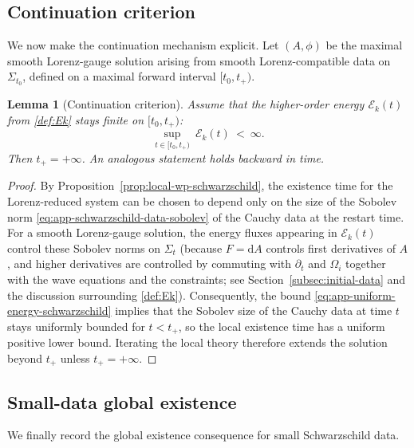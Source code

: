\documentclass[11pt]{article}
\numberwithin{equation}{section}
\theoremstyle{plain}
\newtheorem{lemma}[theorem]{Lemma}
\theoremstyle{definition}
\theoremstyle{remark}
\newcommand{\dd}{\mathrm{d}}
\begin{document}
\subsection{Continuation criterion}\label{app:schw-continuation}

We now make the continuation mechanism explicit.
Let $(A,\phi)$ be the maximal smooth Lorenz-gauge solution arising from smooth Lorenz-compatible data on $\Sigma_{t_0}$, defined on a maximal forward interval $[t_0,t_+)$.

\begin{lemma}[Continuation criterion]\label{lem:continuation-schwarzschild}
Assume that the higher-order energy $\mathcal E_k(t)$ from \eqref{def:Ek} stays finite on $[t_0,t_+)$:
\begin{equation}\label{eq:app-uniform-energy-schwarzschild}
\sup_{t\in[t_{0},t_{+})}\ \mathcal E_k(t)\ <\ \infty.
\end{equation}
Then $t_+=+\infty$.
An analogous statement holds backward in time.
\end{lemma}

\begin{proof}
By Proposition~\ref{prop:local-wp-schwarzschild}, the existence time for the Lorenz-reduced system can be chosen to depend only on the size of the Sobolev norm
\eqref{eq:app-schwarzschild-data-sobolev} of the Cauchy data at the restart time.
For a smooth Lorenz-gauge solution, the energy fluxes appearing in $\mathcal E_k(t)$ control these Sobolev norms on $\Sigma_t$
(because $F=\dd A$ controls first derivatives of $A$, and higher derivatives are controlled by commuting with $\partial_t$ and $\Omega_i$
together with the wave equations and the constraints; see Section~\ref{subsec:initial-data} and the discussion surrounding \eqref{def:Ek}).
Consequently, the bound \eqref{eq:app-uniform-energy-schwarzschild} implies that the Sobolev size of the Cauchy data at time $t$ stays uniformly bounded for $t<t_+$,
so the local existence time has a uniform positive lower bound.
Iterating the local theory therefore extends the solution beyond $t_+$ unless $t_+=+\infty$.
\end{proof}

\subsection{Small-data global existence}\label{app:schw-global}

We finally record the global existence consequence for small Schwarzschild data.
\end{document}
